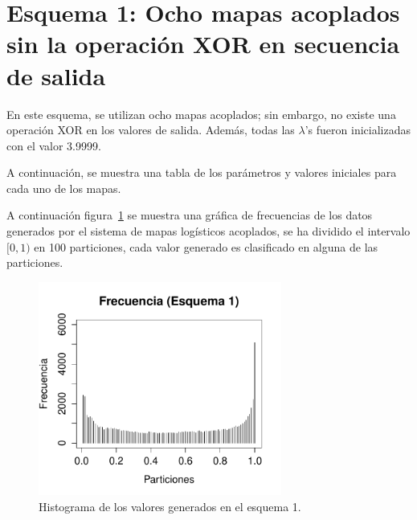 \documentclass[preprint]{elsarticle}
\begin{document}
\section{Esquema 1: \textbf{Ocho mapas acoplados sin la operación XOR} en secuencia de salida}
\label{esq1}

En este esquema, se utilizan ocho mapas acoplados; sin embargo, no existe una operación XOR en los valores de salida. Además, todas las $\lambda$'s  fueron inicializadas con el valor 3.9999. 

A continuación, se muestra una tabla de los parámetros y valores iniciales para cada uno de los mapas.

\begin{table}[H]
\centering
{}
\caption{Valores para cada uno de los mapas utilizados en el esquema 1.}
\label{table1}
\end{table}

A continuación figura~\ref{f1} se muestra una gráfica de frecuencias de los datos generados por el sistema de mapas logísticos acoplados, se ha dividido el intervalo $[0,1)$ en 100 particiones, cada valor generado es clasificado en alguna de las particiones.

\begin{figure}[H]  
\centering
\includegraphics[width=8cm]{figure1.pdf}
\caption{Histograma de los valores generados en el esquema 1.}
\label{f1}
\end{figure}
\end{document}
